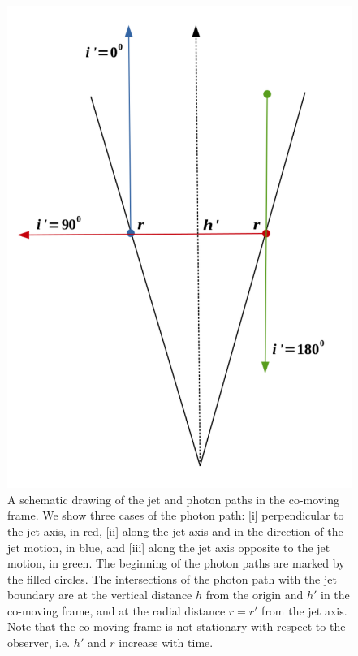 \begin{figure}
\begin{center}
\includegraphics[scale=0.7]{emission_angles--c1.pdf}
\caption[A schematic drawing of the jet, and photon paths in the co-moving frame]{A schematic drawing of the jet and photon paths in the co-moving frame. We show three cases of the photon path: [i] perpendicular to the jet axis, in red, [ii] along the jet axis and in the direction of the jet motion, in blue, and [iii] along the jet axis opposite to the jet motion, in green. The beginning of the photon paths are marked by the filled circles. The intersections of the photon path with the jet boundary are at the vertical distance $h$ from the origin and $h'$ in the co-moving frame, and at the radial distance $r = r'$ from the jet axis. Note that the co-moving frame is not stationary with respect to the observer, i.e. $h'$ and $r$ increase with time.}
\label{fig:The_emission_angles}
\end{center}
\end{figure}

